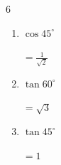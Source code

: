 \begin{multicols}{6}
\begin{enumerate}
  \item $\displaystyle \cos{45^\circ}$

        $\displaystyle =\frac{1}{\sqrt{2}}$

  \item $\displaystyle \tan{60^\circ}$

        $\displaystyle =\sqrt{3}$

  \item $\displaystyle \tan{45^\circ}$

        $\displaystyle =1$

\end{enumerate}
\end{multicols}
